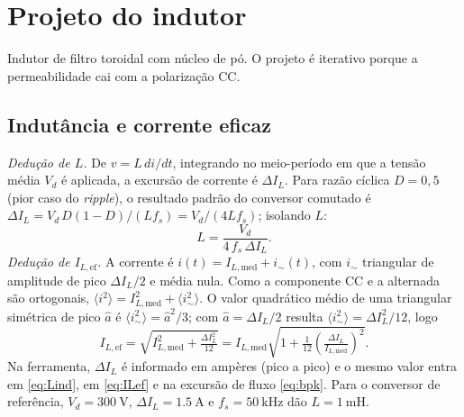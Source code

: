 \documentclass[
	a4paper, 12pt,
	chapter=TITLE, section=Title, subsection=Title,
	oneside, english, brazil, fleqn
]{abntex2}
\begin{document}
\chapter{Projeto do indutor}
Indutor de filtro toroidal com núcleo de pó. O projeto é iterativo porque a
permeabilidade cai com a polarização CC.

\section{Indutância e corrente eficaz}
\textit{Dedução de $L$.} De $v=L\,di/dt$, integrando no meio-período em que a
tensão média $V_d$ é aplicada, a excursão de corrente é $\Delta I_L$. Para razão
cíclica $D=0{,}5$ (pior caso do \emph{ripple}), o resultado padrão do conversor
comutado é $\Delta I_L=V_d\,D(1-D)/(Lf_s)=V_d/(4Lf_s)$; isolando $L$:
\begin{equation}
	L=\frac{V_d}{4\,f_s\,\Delta I_L}.
	\label{eq:Lind}
\end{equation}
\textit{Dedução de $I_{L,\mathrm{ef}}$.} A corrente é $i(t)=I_{L,\mathrm{med}}+i_{\sim}(t)$,
com $i_{\sim}$ triangular de amplitude de pico $\Delta I_L/2$ e média nula. Como a
componente CC e a alternada são ortogonais, $\langle i^2\rangle=I_{L,\mathrm{med}}^2+\langle i_{\sim}^2\rangle$.
O valor quadrático médio de uma triangular simétrica de pico $\hat a$ é
$\langle i_\sim^2\rangle=\hat a^2/3$; com $\hat a=\Delta I_L/2$ resulta
$\langle i_\sim^2\rangle=\Delta I_L^2/12$, logo
\begin{equation}
	I_{L,\mathrm{ef}}=\sqrt{I_{L,\mathrm{med}}^2+\tfrac{\Delta I_L^2}{12}}
	=I_{L,\mathrm{med}}\sqrt{1+\tfrac{1}{12}\!\left(\tfrac{\Delta I_L}{I_{L,\mathrm{med}}}\right)^{2}}.
	\label{eq:ILef}
\end{equation}
Na ferramenta, $\Delta I_L$ é informado em ampères (pico a pico) e o mesmo valor
entra em \eqref{eq:Lind}, em \eqref{eq:ILef} e na excursão de fluxo
\eqref{eq:bpk}. Para o conversor de referência, $V_d=\SI{300}{\volt}$,
$\Delta I_L=\SI{1.5}{\ampere}$ e $f_s=\SI{50}{\kilo\hertz}$ dão
$L=\SI{1}{\milli\henry}$.
\end{document}
